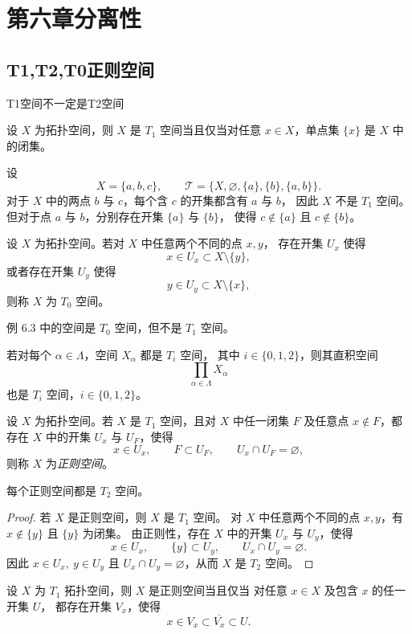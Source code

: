 \chapter{第六章分离性}
\section{T1,T2,T0正则空间}
T1空间不一定是T2空间
\begin{theorem}[定理 6.2]
设 $X$ 为拓扑空间，则 $X$ 是 $T_1$ 空间当且仅当对任意 $x\in X$，单点集 $\{x\}$ 是 $X$ 中的闭集。
\end{theorem}
\begin{example}
设
\[
X=\{a,b,c\},\qquad 
\mathcal T=\{X,\varnothing,\{a\},\{b\},\{a,b\}\}.
\]
对于 $X$ 中的两点 $b$ 与 $c$，每个含 $c$ 的开集都含有 $a$ 与 $b$，
因此 $X$ 不是 $T_1$ 空间。
但对于点 $a$ 与 $b$，分别存在开集 $\{a\}$ 与 $\{b\}$，
使得 $c\notin\{a\}$ 且 $c\notin\{b\}$。
\end{example}
\begin{definition}[定义 6.4]
设 $X$ 为拓扑空间。若对 $X$ 中任意两个不同的点 $x,y$，
存在开集 $U_x$ 使得
\[
x\in U_x\subset X\setminus\{y\},
\]
或者存在开集 $U_y$ 使得
\[
y\in U_y\subset X\setminus\{x\},
\]
则称 $X$ 为 $T_0$ 空间。
\end{definition}

\begin{remark}
例 6.3 中的空间是 $T_0$ 空间，但不是 $T_1$ 空间。
\end{remark}
\begin{theorem}[都是T某空间的直积也是T某空间]
若对每个 $\alpha\in\Lambda$，空间 $X_\alpha$ 都是 $T_i$ 空间，
其中 $i\in\{0,1,2\}$，则其直积空间
\[
\prod_{\alpha\in\Lambda} X_\alpha
\]
也是 $T_i$ 空间，$i\in\{0,1,2\}$。
\end{theorem}
\begin{definition}[T1空间+只要x不属于闭集就能找到包含x的开集和包含F的开集不相交]
设 $X$ 为拓扑空间。若 $X$ 是 $T_1$ 空间，且对 $X$ 中任一闭集 $F$
及任意点 $x\notin F$，都存在 $X$ 中的开集 $U_x$ 与 $U_F$，使得
\[
x\in U_x,\qquad F\subset U_F,\qquad U_x\cap U_F=\varnothing,
\]
则称 $X$ 为\emph{正则空间}。
\end{definition}

\begin{theorem}[正则空间都是T2空间]
每个正则空间都是 $T_2$ 空间。
\end{theorem}

\begin{proof}
若 $X$ 是正则空间，则 $X$ 是 $T_1$ 空间。
对 $X$ 中任意两个不同的点 $x,y$，有 $x\notin\{y\}$ 且 $\{y\}$ 为闭集。
由正则性，存在 $X$ 中的开集 $U_x$ 与 $U_y$，使得
\[
x\in U_x,\qquad \{y\}\subset U_y,\qquad U_x\cap U_y=\varnothing.
\]
因此 $x\in U_x,\ y\in U_y$ 且 $U_x\cap U_y=\varnothing$，从而 $X$ 是 $T_2$ 空间。
\end{proof}

\begin{theorem}
设 $X$ 为 $T_1$ 拓扑空间，则 $X$ 是正则空间当且仅当
对任意 $x\in X$ 及包含 $x$ 的任一开集 $U$，
都存在开集 $V_x$，使得
\[
x\in V_x\subset \overline{V_x}\subset U.
\]
\end{theorem}